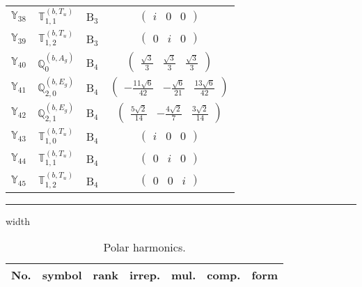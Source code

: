 \documentclass[fleqn,10pt,landscape]{article}
\begin{document}
\begin{itemize}
\begin{center}
\begin{longtable}{c|c|c|c}
$ \mathbb{Y}_{38} $ & $\mathbb{T}_{1,1}^{(b,T_{u})}$ & B$_{3}$ & $\begin{pmatrix} i & 0 & 0 \end{pmatrix}$ \\
$ \mathbb{Y}_{39} $ & $\mathbb{T}_{1,2}^{(b,T_{u})}$ & B$_{3}$ & $\begin{pmatrix} 0 & i & 0 \end{pmatrix}$ \\ \hline
$ \mathbb{Y}_{40} $ & $\mathbb{Q}_{0}^{(b,A_{g})}$ & B$_{4}$ & $\begin{pmatrix} \frac{\sqrt{3}}{3} & \frac{\sqrt{3}}{3} & \frac{\sqrt{3}}{3} \end{pmatrix}$ \\
$ \mathbb{Y}_{41} $ & $\mathbb{Q}_{2,0}^{(b,E_{g})}$ & B$_{4}$ & $\begin{pmatrix} - \frac{11 \sqrt{6}}{42} & - \frac{\sqrt{6}}{21} & \frac{13 \sqrt{6}}{42} \end{pmatrix}$ \\
$ \mathbb{Y}_{42} $ & $\mathbb{Q}_{2,1}^{(b,E_{g})}$ & B$_{4}$ & $\begin{pmatrix} \frac{5 \sqrt{2}}{14} & - \frac{4 \sqrt{2}}{7} & \frac{3 \sqrt{2}}{14} \end{pmatrix}$ \\
$ \mathbb{Y}_{43} $ & $\mathbb{T}_{1,0}^{(b,T_{u})}$ & B$_{4}$ & $\begin{pmatrix} i & 0 & 0 \end{pmatrix}$ \\
$ \mathbb{Y}_{44} $ & $\mathbb{T}_{1,1}^{(b,T_{u})}$ & B$_{4}$ & $\begin{pmatrix} 0 & i & 0 \end{pmatrix}$ \\
$ \mathbb{Y}_{45} $ & $\mathbb{T}_{1,2}^{(b,T_{u})}$ & B$_{4}$ & $\begin{pmatrix} 0 & 0 & i \end{pmatrix}$ \\
\end{longtable}
\end{center}

 \hfil \hrule height 1mm width \textwidth \hfil

\begin{center}
\renewcommand{\arraystretch}{1.3}
\begin{longtable}{ccccccc}
\caption{Polar harmonics.}
 \\
 \hline \hline
No. & symbol & rank & irrep. & mul. & comp. & form \\ \hline \endfirsthead


\end{longtable}
\end{center}
\end{itemize}
\end{document}
